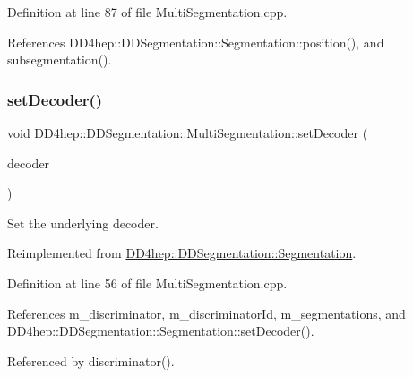 Definition at line 87 of file Multi\+Segmentation.\+cpp.



References D\+D4hep\+::\+D\+D\+Segmentation\+::\+Segmentation\+::position(), and subsegmentation().

\hypertarget{class_d_d4hep_1_1_d_d_segmentation_1_1_multi_segmentation_a21a046717c1aae25d103dddeb2829cb9}{}\label{class_d_d4hep_1_1_d_d_segmentation_1_1_multi_segmentation_a21a046717c1aae25d103dddeb2829cb9} 
\subsubsection{\texorpdfstring{set\+Decoder()}{setDecoder()}}
{\footnotesize\ttfamily void D\+D4hep\+::\+D\+D\+Segmentation\+::\+Multi\+Segmentation\+::set\+Decoder (\begin{DoxyParamCaption}\item[{\hyperlink{class_d_d4hep_1_1_d_d_segmentation_1_1_bit_field64}{Bit\+Field64} $\ast$}]{decoder }\end{DoxyParamCaption})\hspace{0.3cm}{\ttfamily [virtual]}}



Set the underlying decoder. 



Reimplemented from \hyperlink{class_d_d4hep_1_1_d_d_segmentation_1_1_segmentation_ab5973bc06538d13b1991f55e40635fa0}{D\+D4hep\+::\+D\+D\+Segmentation\+::\+Segmentation}.



Definition at line 56 of file Multi\+Segmentation.\+cpp.



References m\+\_\+discriminator, m\+\_\+discriminator\+Id, m\+\_\+segmentations, and D\+D4hep\+::\+D\+D\+Segmentation\+::\+Segmentation\+::set\+Decoder().



Referenced by discriminator().

\hypertarget{class_d_d4hep_1_1_d_d_segmentation_1_1_multi_segmentation_ab92a5093c6c11598715a9af554475175}{}\label{class_d_d4hep_1_1_d_d_segmentation_1_1_multi_segmentation_ab92a5093c6c11598715a9af554475175} 
